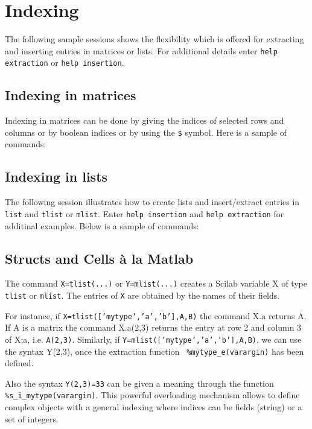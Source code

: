 \section{Indexing}

The following sample sessions shows the flexibility which is offered
for extracting and inserting entries in matrices or lists.
For additional details enter \verb!help extraction! 
or \verb!help insertion!.
\subsection{Indexing in matrices}
Indexing in matrices can be done by giving the indices of selected
rows and columns or by boolean indices or by using the \verb!$! symbol.
Here is a sample of commands: 


\subsection{Indexing in lists}
The following session illustrates how to create lists and
insert/extract entries in {\tt list} and {\tt tlist} or {\tt mlist}.
Enter {\tt help insertion} and {\tt help extraction} for additinal examples.
Below is a sample of commands:


\subsection{Structs and Cells \`a la Matlab}
The command {\tt X=tlist(...)} or {\tt Y=mlist(...)} creates a
Scilab variable X of type {\tt tlist} or {\tt mlist}.
The entries of {\tt X} are obtained by the names of their fields.

For instance, if {\tt X=tlist(['mytype','a','b'],A,B)} the command
X.a returns A. If A is a matrix the command X.a(2,3) returns the 
entry at row 2 and column 3 of X;a, i.e. {\tt A(2,3)}.
Similarly, if {\tt Y=mlist(['mytype','a','b'],A,B)}, we can use the
syntax Y(2,3), once the extraction function \verb! %mytype_e(varargin)!
has been defined. 

Also the syntax {\tt Y(2,3)=33} can be given a meaning
through the function \verb!%s_i_mytype(varargin)!. 
This powerful overloading mechanism allows to define complex objects
with a general indexing where indices can be fields (string) or a set
of integers.

